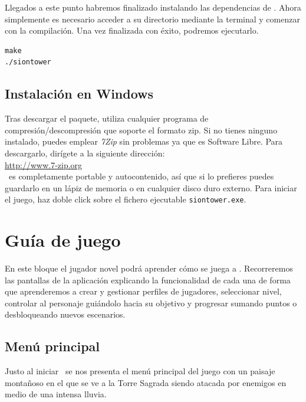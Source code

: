 \documentclass[a4paper,11pt]{article}
\begin{document}
Llegados a este punto habremos finalizado instalando las dependencias de
\juego. Ahora simplemente es necesario acceder a su directorio mediante
la terminal y comenzar con la compilación. Una vez finalizada con éxito,
podremos ejecutarlo.

\begin{lstlisting}[style=consola]
make
./siontower
\end{lstlisting}



\subsection{Instalación en Windows}

Tras descargar el paquete, utiliza cualquier programa de compresión/descompresión
que soporte el formato zip. Si no tienes ninguno instalado, puedes emplear
\textit{7Zip} sin problemas ya que es Software Libre. Para descargarlo, dirígete
a la siguiente dirección:\\

\url{http://www.7-zip.org}\\

\juego\ es completamente portable y autocontenido, así que si lo prefieres
puedes guardarlo en un lápiz de memoria o en cualquier disco duro externo.
Para iniciar el juego, haz doble click sobre el fichero ejecutable
\texttt{siontower.exe}.

\section{Guía de juego}

En este bloque el jugador novel podrá aprender cómo se juega a \juego.
Recorreremos las pantallas de la aplicación explicando la funcionalidad de
cada una de forma que aprenderemos a crear y gestionar perfiles de jugadores,
seleccionar nivel, controlar al personaje guiándolo hacia su objetivo y
progresar sumando puntos o desbloqueando nuevos escenarios.\\

\subsection{Menú principal}

Justo al iniciar \juego\ se nos presenta el menú principal del juego con
un paisaje montañoso en el que se ve a la Torre Sagrada siendo atacada
por enemigos en medio de una intensa lluvia.
\end{document}
